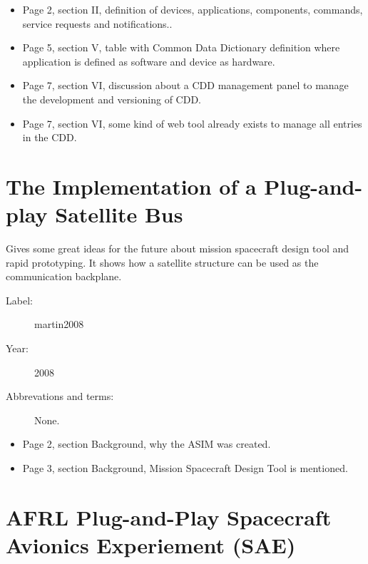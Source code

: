 \begin{itemize}
    \item Page 2, section II, definition of devices, applications, components,
        commands, service requests and notifications..
    \item Page 5, section V, table with Common Data Dictionary definition where
        application is defined as software and device as hardware.
    \item Page 7, section VI, discussion about a CDD management panel to manage
        the development and versioning of CDD.
    \item Page 7, section VI, some kind of web tool already exists to manage
        all entries in the CDD.
\end{itemize}

\section{The Implementation of a Plug-and-play Satellite Bus}

Gives some great ideas for the future about mission spacecraft design tool and
rapid prototyping. It shows how a satellite structure can be used as the
communication backplane.

\begin{description}
    \item[Label:] martin2008 \cite{martin2008}
    \item[Year:] 2008
    \item[Abbrevations and terms:] None.
\end{description}

\begin{itemize}
    \item Page 2, section Background, why the ASIM was created.
    \item Page 3, section Background, Mission Spacecraft Design Tool is
        mentioned.
\end{itemize}

\section{AFRL Plug-and-Play Spacecraft Avionics Experiement (SAE)}


